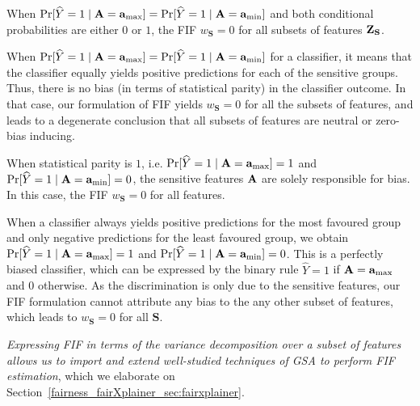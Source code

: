 \begin{proposition}
	When $ \Pr[\widehat{Y} = 1 \mid \mathbf{A} = \mathbf{a}_{\max} ] = \Pr[\widehat{Y} = 1 \mid \mathbf{A} = \mathbf{a}_{\min} ] $ and both conditional probabilities are either $ 0 $ or $ 1 $, the FIF $w_{\mathbf{S}}  = 0 $ for all subsets of features $ \mathbf{Z}_{\mathbf{S}} $.
\end{proposition}
When $ \Pr[\widehat{Y} = 1 \mid \mathbf{A} = \mathbf{a}_{\max} ] = \Pr[\widehat{Y} = 1 \mid \mathbf{A} = \mathbf{a}_{\min} ] $ for a classifier, it means that the classifier equally yields positive predictions for each of the sensitive groups. Thus, there is no bias (in terms of statistical parity) in the classifier outcome. In that case, our formulation of FIF yields $w_{\mathbf{S}}  = 0 $ for all the subsets of features, and leads to a degenerate conclusion that all subsets of features are neutral or zero-bias inducing.
\begin{proposition}
	{When statistical parity is $ 1 $, i.e. $ \Pr[\widehat{Y} = 1 \mid \mathbf{A} = \mathbf{a}_{\max} ] = 1 $ and $ \Pr[\widehat{Y} = 1 \mid \mathbf{A} = \mathbf{a}_{\min} ] = 0 $, the sensitive features $ \mathbf{A} $ are solely responsible for bias. In this case, the FIF $ w_{\mathbf{S}} = 0 $ for all features.}
\end{proposition}
When a classifier always yields positive predictions for the most favoured group and only negative predictions for the least favoured group, we obtain $ \Pr[\widehat{Y} = 1 \mid \mathbf{A} = \mathbf{a}_{\max} ] = 1 $ and $ \Pr[\widehat{Y} = 1 \mid \mathbf{A} = \mathbf{a}_{\min} ] = 0 $. This is a perfectly biased classifier, which can be expressed by the binary rule $\widehat{Y} = 1$ if $\mathbf{A} = \mathbf{a}_{\max}$ and $0$ otherwise. As the discrimination is only due to the sensitive features, our FIF formulation cannot attribute any bias to the any other subset of  features, which leads to $ w_{\mathbf{S}} = 0 $ for all $\mathbf{S}$.



\textit{Expressing FIF in terms of the variance decomposition over a subset of features allows us to import and extend well-studied techniques of GSA to perform FIF estimation}, which we elaborate on Section~\ref{fairness_fairXplainer_sec:fairxplainer}.
